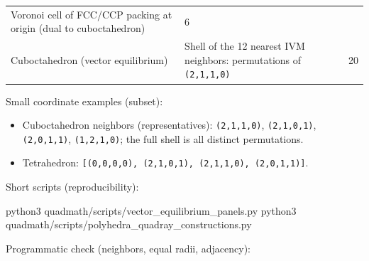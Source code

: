 \documentclass[
]{article}
\newenvironment{Shaded}{}{}
\newcommand{\ExtensionTok}[1]{#1}
\newcommand{\NormalTok}[1]{#1}
\providecommand{\tightlist}{%
  \setlength{\itemsep}{0pt}\setlength{\parskip}{0pt}}
\begin{document}
\begin{longtable}[]{@{}lll@{}}
\begin{minipage}[t]{0.30\columnwidth}
Voronoi cell of FCC/CCP packing at origin (dual to cuboctahedron)\strut
\end{minipage} & \begin{minipage}[t]{0.30\columnwidth}\raggedright
6\strut
\end{minipage}\tabularnewline
\begin{minipage}[t]{0.30\columnwidth}\raggedright
Cuboctahedron (vector equilibrium)\strut
\end{minipage} & \begin{minipage}[t]{0.30\columnwidth}\raggedright
Shell of the 12 nearest IVM neighbors: permutations of
\texttt{(2,1,1,0)}\strut
\end{minipage} & \begin{minipage}[t]{0.30\columnwidth}\raggedright
20\strut
\end{minipage}\tabularnewline
\bottomrule
\end{longtable}

Small coordinate examples (subset):

\begin{itemize}
\tightlist
\item
  Cuboctahedron neighbors (representatives): \texttt{(2,1,1,0)},
  \texttt{(2,1,0,1)}, \texttt{(2,0,1,1)}, \texttt{(1,2,1,0)}; the full
  shell is all distinct permutations.
\item
  Tetrahedron:
  \texttt{{[}(0,0,0,0),\ (2,1,0,1),\ (2,1,1,0),\ (2,0,1,1){]}}.
\end{itemize}

Short scripts (reproducibility):

\begin{Shaded}
\begin{Highlighting}[]
\ExtensionTok{python3}\NormalTok{ quadmath/scripts/vector\_equilibrium\_panels.py}
\ExtensionTok{python3}\NormalTok{ quadmath/scripts/polyhedra\_quadray\_constructions.py}
\end{Highlighting}
\end{Shaded}

Programmatic check (neighbors, equal radii, adjacency):
\end{document}
